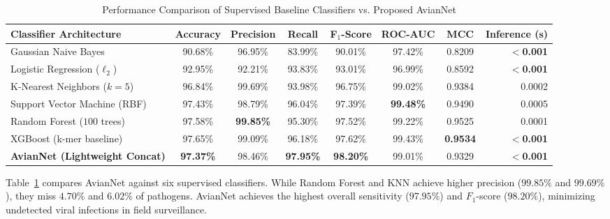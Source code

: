 \documentclass[conference]{IEEEtran}
\begin{document}
\begin{table}[t]
  \centering
  \caption{Performance Comparison of Supervised Baseline Classifiers vs. Proposed AvianNet}
  \label{tab:baseline_comparison}
  \begin{tabular}{lccccccr}
    \toprule
    \textbf{Classifier Architecture} & \textbf{Accuracy} & \textbf{Precision} & \textbf{Recall} & \textbf{F$_1$-Score} & \textbf{ROC-AUC} & \textbf{MCC} & \textbf{Inference (s)} \\
    \midrule
    Gaussian Naive Bayes             & 90.68\%           & 96.95\%            & 83.99\%         & 90.01\%              & 97.42\%          & 0.8209       & \textbf{$<$0.001}      \\
    Logistic Regression ($\ell_2$)   & 92.95\%           & 92.21\%            & 93.83\%         & 93.01\%              & 96.99\%          & 0.8592       & \textbf{$<$0.001}      \\
    K-Nearest Neighbors ($k{=}5$)    & 96.84\%           & 99.69\%            & 93.98\%         & 96.75\%              & 99.02\%          & 0.9384       & 0.0002                 \\
    Support Vector Machine (RBF)     & 97.43\%           & 98.79\%            & 96.04\%         & 97.39\%              & \textbf{99.48\%} & 0.9490       & 0.0005                 \\
    Random Forest ($100$ trees)      & 97.58\%           & \textbf{99.85\%}   & 95.30\%         & 97.52\%              & 99.22\%          & 0.9525       & 0.0001                 \\
    XGBoost (k-mer baseline)         & 97.65\%           & 99.09\%            & 96.18\%         & 97.62\%              & 99.43\%          & \textbf{0.9534} & \textbf{$<$0.001}   \\
    \midrule
    \textbf{AvianNet (Lightweight Concat)} & \textbf{97.37\%} & 98.46\%       & \textbf{97.95\%}& \textbf{98.20\%}     & 99.01\%          & 0.9329       & \textbf{$<$0.001}      \\
    \bottomrule
  \end{tabular}
\end{table}

Table~\ref{tab:baseline_comparison} compares AvianNet against six supervised classifiers. While Random Forest and KNN achieve higher precision ($99.85\%$ and $99.69\%$), they miss $4.70\%$ and $6.02\%$ of pathogens. AvianNet achieves the highest overall sensitivity ($97.95\%$) and $F_1$-score ($98.20\%$), minimizing undetected viral infections in field surveillance.
\end{document}
